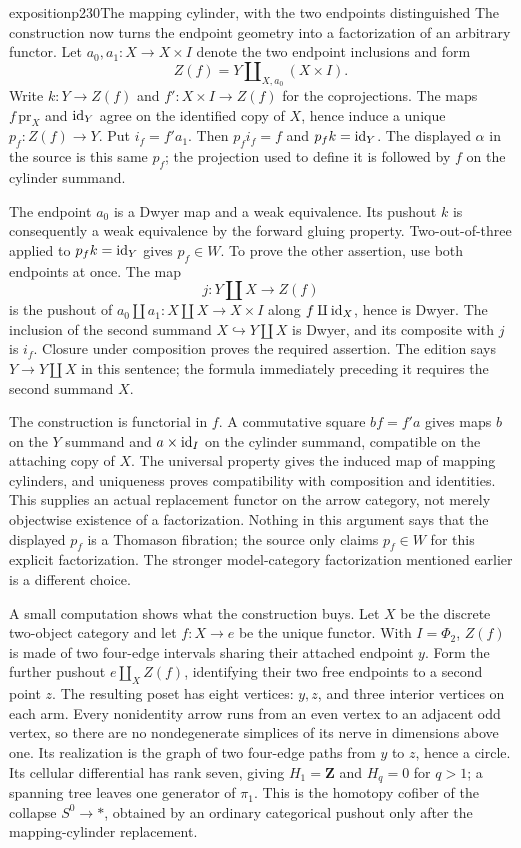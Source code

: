 \begin{dcomment}{exposition}{p230}{The mapping cylinder, with the two endpoints distinguished}
The construction now turns the endpoint geometry into a factorization of an arbitrary functor. Let $a_0,a_1:X\to X\times I$ denote the two endpoint inclusions and form
\[
 Z(f)=Y\amalg_{X,a_0}(X\times I).
\]
Write $k:Y\to Z(f)$ and $f':X\times I\to Z(f)$ for the coprojections. The maps $f\,\mathrm{pr}_X$ and $\mathrm{id}_Y$ agree on the identified copy of $X$, hence induce a unique $p_f:Z(f)\to Y$. Put $i_f=f'a_1$. Then $p_fi_f=f$ and $p_fk=\mathrm{id}_Y$. The displayed $\alpha$ in the source is this same $p_f$; the projection used to define it is followed by $f$ on the cylinder summand.

The endpoint $a_0$ is a Dwyer map and a weak equivalence. Its pushout $k$ is consequently a weak equivalence by the forward gluing property. Two-out-of-three applied to $p_fk=\mathrm{id}_Y$ gives $p_f\in W$. To prove the other assertion, use both endpoints at once. The map
\[
 j:Y\amalg X\longrightarrow Z(f)
\]
is the pushout of $a_0\amalg a_1:X\amalg X\to X\times I$ along $f\amalg\mathrm{id}_X$, hence is Dwyer. The inclusion of the second summand $X\hookrightarrow Y\amalg X$ is Dwyer, and its composite with $j$ is $i_f$. Closure under composition proves the required assertion. The edition says $Y\to Y\amalg X$ in this sentence; the formula immediately preceding it requires the second summand $X$.

The construction is functorial in $f$. A commutative square $bf=f'a$ gives maps $b$ on the $Y$ summand and $a\times\mathrm{id}_I$ on the cylinder summand, compatible on the attaching copy of $X$. The universal property gives the induced map of mapping cylinders, and uniqueness proves compatibility with composition and identities. This supplies an actual replacement functor on the arrow category, not merely objectwise existence of a factorization. Nothing in this argument says that the displayed $p_f$ is a Thomason fibration; the source only claims $p_f\in W$ for this explicit factorization. The stronger model-category factorization mentioned earlier is a different choice.

A small computation shows what the construction buys. Let $X$ be the discrete two-object category and let $f:X\to e$ be the unique functor. With $I=\Phi_2$, $Z(f)$ is made of two four-edge intervals sharing their attached endpoint $y$. Form the further pushout $e\amalg_X Z(f)$, identifying their two free endpoints to a second point $z$. The resulting poset has eight vertices: $y,z$, and three interior vertices on each arm. Every nonidentity arrow runs from an even vertex to an adjacent odd vertex, so there are no nondegenerate simplices of its nerve in dimensions above one. Its realization is the graph of two four-edge paths from $y$ to $z$, hence a circle. Its cellular differential has rank seven, giving $H_1=\mathbf Z$ and $H_q=0$ for $q>1$; a spanning tree leaves one generator of $\pi_1$. This is the homotopy cofiber of the collapse $S^0\to *$, obtained by an ordinary categorical pushout only after the mapping-cylinder replacement.
\end{dcomment}



